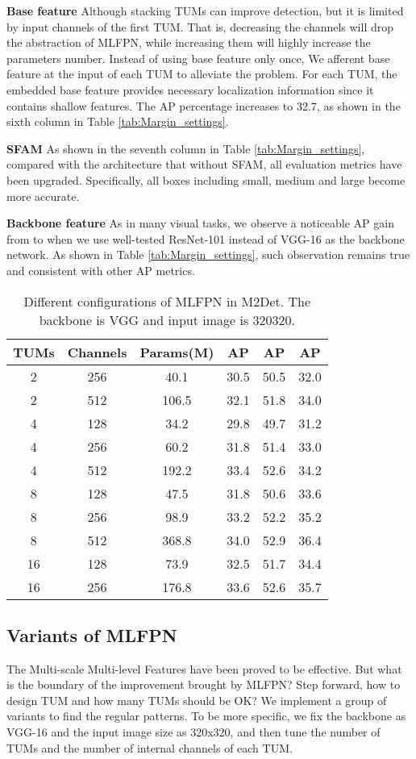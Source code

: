 \documentclass[letterpaper]{article} \usepackage{aaai18}  \usepackage{times}  \usepackage{helvet}  \usepackage{courier}  \usepackage{url}  \usepackage{graphicx}
\begin{document}
\textbf{Base feature} Although stacking TUMs can improve detection, but it is limited by input channels of the first TUM. That is, decreasing the channels will drop the abstraction of MLFPN, while increasing them will highly increase the parameters number. Instead of using base feature only once, We afferent base feature at the input of each TUM to alleviate the problem. For each TUM, the embedded base feature provides necessary localization information since it contains shallow features. The AP percentage increases to 32.7, as shown in the sixth column in Table \ref{tab:Margin_settings}.

\textbf{SFAM}
 As shown in the seventh column in Table \ref{tab:Margin_settings}, compared with the architecture that without SFAM, all evaluation metrics have been upgraded. Specifically, all boxes including small, medium and large become more accurate.

\textbf{Backbone feature}
As in many visual tasks, we observe a noticeable AP gain from  to  when we use well-tested ResNet-101 \cite{HeZRS16} instead of VGG-16 as the backbone network. As shown in Table \ref{tab:Margin_settings}, such observation remains true and consistent with other AP metrics.


\begin{table}[h]
\scriptsize
\centering
\begin{tabular}{cc||cccc}
\toprule
TUMs &Channels&Params(M)&AP&AP&AP\\
\hline\hline
2& 256 & 40.1 & 30.5 &50.5&32.0\\
2& 512 & 106.5& 32.1&51.8&34.0\\4& 128 &34.2& 29.8& 49.7&31.2\\
4& 256 &60.2& 31.8&51.4&33.0\\
4& 512 &192.2 & 33.4 & 52.6 & 34.2\\8& 128 &47.5& 31.8& 50.6&33.6\\
8& 256 &98.9& 33.2& 52.2&35.2\\
8& 512 &368.8& 34.0& 52.9&36.4\\16& 128 &73.9 &32.5 &51.7&34.4\\
16& 256 & 176.8&33.6 &52.6&35.7\\
\bottomrule
\end{tabular}
\caption{Different configurations of MLFPN in M2Det. The backbone is VGG and input image is 320320.}
\label{tab:tum_ablation}
\end{table}

\subsection{Variants of MLFPN}
The Multi-scale Multi-level Features have been proved to be effective. But what is the boundary of the improvement brought by MLFPN? Step forward, how to design TUM and how many TUMs should be OK? We implement a group of variants to find the regular patterns. To be more specific, we fix the backbone as VGG-16 and the input image size as 320x320, and then tune the number of TUMs and the number of internal channels of each TUM.
\end{document}
